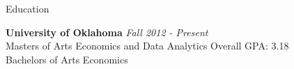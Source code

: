 \documentclass{resume} %
\begin{document}

\begin{rSection}{Education}

{\bf University of Oklahoma} \hfill {\em Fall 2012 - Present} 
\\ Masters of Arts Economics and Data Analytics \hfill { Overall GPA: 3.18}
\\ Bachelors of Arts Economics 


\end{rSection}




\end{document}
